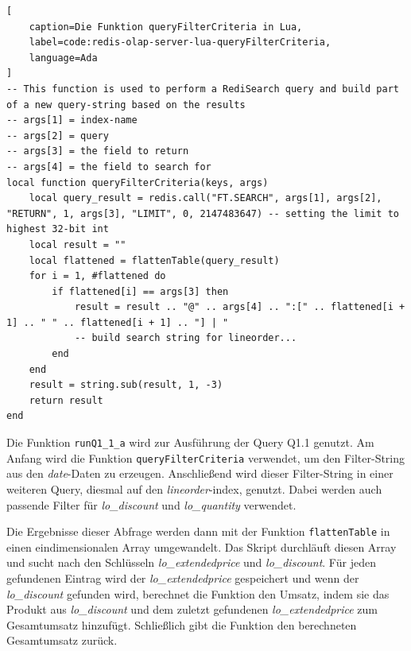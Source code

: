\begin{lstlisting}[
    caption=Die Funktion queryFilterCriteria in Lua,
    label=code:redis-olap-server-lua-queryFilterCriteria,
    language=Ada
]
-- This function is used to perform a RediSearch query and build part of a new query-string based on the results
-- args[1] = index-name
-- args[2] = query
-- args[3] = the field to return
-- args[4] = the field to search for
local function queryFilterCriteria(keys, args)
    local query_result = redis.call("FT.SEARCH", args[1], args[2], "RETURN", 1, args[3], "LIMIT", 0, 2147483647) -- setting the limit to highest 32-bit int
    local result = ""
    local flattened = flattenTable(query_result)
    for i = 1, #flattened do
        if flattened[i] == args[3] then
            result = result .. "@" .. args[4] .. ":[" .. flattened[i + 1] .. " " .. flattened[i + 1] .. "] | "
            -- build search string for lineorder...
        end
    end
    result = string.sub(result, 1, -3)
    return result
end
\end{lstlisting}

Die Funktion \lstinline|runQ1_1_a| wird zur Ausführung der Query Q1.1 genutzt. Am Anfang wird die Funktion \lstinline|queryFilterCriteria| verwendet, um den Filter-String aus den \emph{date}-Daten zu erzeugen. Anschließend wird dieser Filter-String in einer weiteren Query, diesmal auf den \emph{lineorder}-index, genutzt. Dabei werden auch passende Filter für \emph{lo\_discount} und \emph{lo\_quantity} verwendet.

Die Ergebnisse dieser Abfrage werden dann mit der Funktion \lstinline|flattenTable| in einen eindimensionalen Array umgewandelt. Das Skript durchläuft diesen Array und sucht nach den Schlüsseln \emph{lo\_extendedprice} und \emph{lo\_discount}. Für jeden gefundenen Eintrag wird der \emph{lo\_extendedprice} gespeichert und wenn der \emph{lo\_discount} gefunden wird, berechnet die Funktion den Umsatz, indem sie das Produkt aus \emph{lo\_discount} und dem zuletzt gefundenen \emph{lo\_extendedprice} zum Gesam\-tumsatz hinzufügt.
Schließlich gibt die Funktion den berechneten Gesamt\-umsatz zurück.

